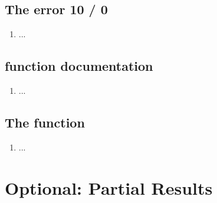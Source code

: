 \subsection{The error 10 / 0}
\begin{enumerate}[resume*]
\item ...
\end{enumerate}

\subsection{ function documentation}
\begin{enumerate}[resume*]
\item ...
\end{enumerate}

\subsection{The  function}
\begin{enumerate}[resume*]
\item ...
\end{enumerate}


\section{Optional: Partial Results}

